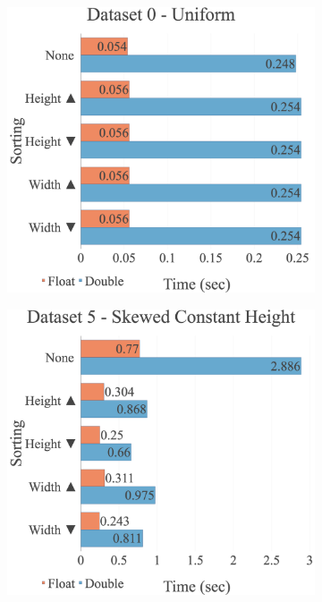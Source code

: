 \begin{figure}[H]
\centering
\begin{subfigure}{.49\textwidth}
  \centering
  \includegraphics[width=1\linewidth]{img/experiments/option-sorts-0_UNIFORM.png}
\end{subfigure}
\begin{subfigure}{.49\textwidth}
  \centering
  \includegraphics[width=1\linewidth]{img/experiments/option-sorts-5_SKEWEDCONSTHEIGHT.png}

\end{subfigure}
\end{figure}
